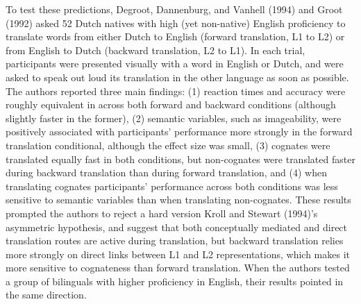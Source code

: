 \documentclass[
  man]{apa6}
\begin{document}
To test these predictions, Degroot, Dannenburg, and Vanhell (1994) and
Groot (1992) asked 52 Dutch natives with high (yet non-native) English
proficiency to translate words from either Dutch to English (forward
translation, L1 to L2) or from English to Dutch (backward translation,
L2 to L1). In each trial, participants were presented visually with a
word in English or Dutch, and were asked to speak out loud its
translation in the other language as soon as possible. The authors
reported three main findings: (1) reaction times and accuracy were
roughly equivalent in across both forward and backward conditions
(although slightly faster in the former), (2) semantic variables, such
as imageability, were positively associated with participants'
performance more strongly in the forward translation conditional,
although the effect size was small, (3) cognates were translated equally
fast in both conditions, but non-cognates were translated faster during
backward translation than during forward translation, and (4) when
translating cognates participants' performance across both conditions
was less sensitive to semantic variables than when translating
non-cognates. These results prompted the authors to reject a hard
version Kroll and Stewart (1994)'s asymmetric hypothesis, and suggest
that both conceptually mediated and direct translation routes are active
during translation, but backward translation relies more strongly on
direct links between L1 and L2 representations, which makes it more
sensitive to cognateness than forward translation. When the authors
tested a group of bilinguals with higher proficiency in English, their
results pointed in the same direction.
\end{document}
